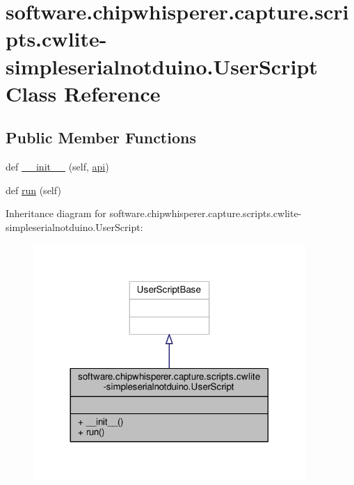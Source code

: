 \hypertarget{classsoftware_1_1chipwhisperer_1_1capture_1_1scripts_1_1cwlite-simpleserialnotduino_1_1UserScript}{}\section{software.\+chipwhisperer.\+capture.\+scripts.\+cwlite-\/simpleserialnotduino.User\+Script Class Reference}
\label{classsoftware_1_1chipwhisperer_1_1capture_1_1scripts_1_1cwlite-simpleserialnotduino_1_1UserScript}
\subsection*{Public Member Functions}
\begin{DoxyCompactItemize}
\item 
def \hyperlink{classsoftware_1_1chipwhisperer_1_1capture_1_1scripts_1_1cwlite-simpleserialnotduino_1_1UserScript_aa8347fcc0ca909505531bc1d80f6c238}{\+\_\+\+\_\+init\+\_\+\+\_\+} (self, \hyperlink{namespacesoftware_1_1chipwhisperer_1_1capture_1_1scripts_1_1cwlite-simpleserialnotduino_a0c9ed2654c291d4613bdc37fc846be35}{api})
\item 
def \hyperlink{classsoftware_1_1chipwhisperer_1_1capture_1_1scripts_1_1cwlite-simpleserialnotduino_1_1UserScript_abd8003387da659db60a73ee8eadebecf}{run} (self)
\end{DoxyCompactItemize}


Inheritance diagram for software.\+chipwhisperer.\+capture.\+scripts.\+cwlite-\/simpleserialnotduino.User\+Script\+:\nopagebreak
\begin{figure}[H]
\begin{center}
\leavevmode
\includegraphics[width=293pt]{db/dd1/classsoftware_1_1chipwhisperer_1_1capture_1_1scripts_1_1cwlite-simpleserialnotduino_1_1UserScript__inherit__graph}
\end{center}
\end{figure}


